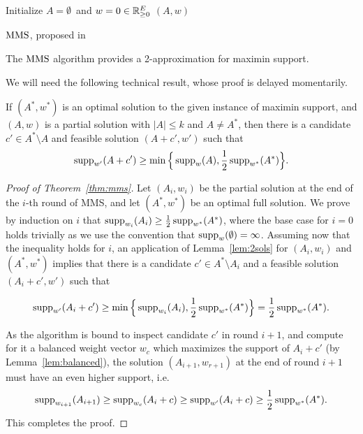 \begin{algorithm}[htb]\label{alg:mms}
\SetAlgoLined
{}
Initialize $A=\emptyset$\ and $w=0\in \mathbb{R}_{\geq 0}^E$\;
\Return $(A,w)$\;
\caption{$\operatorname{MMS}$, proposed in~\cite{sanchez2016maximin}}
\end{algorithm}

\begin{theorem}\label{thm:mms}
The $\operatorname{MMS}$ algorithm provides a 2-approximation for maximin support.
\end{theorem}

We will need the following technical result, whose proof is delayed momentarily. 

\begin{lemma}\label{lem:2sols}
If $(A^*, w^*)$ is an optimal solution to the given instance of maximin support, and $(A,w)$ is a partial solution with $|A|\leq k$ and $A\neq A^*$, then there is a candidate $c'\in A^*\setminus A$ and feasible solution $(A+c', w')$ such that 
$$\operatorname{supp}_{w'}(A+c')\geq \min\Big\{\operatorname{supp}_w(A), \frac{1}{2} \operatorname{supp}_{w^*}(A^*)\Big\}.$$
\end{lemma}


\begin{proof}[Proof of Theorem~\ref{thm:mms}]
Let $(A_i, w_i)$ be the partial solution at the end of the $i$-th round of MMS, and let $(A^*, w^*)$ be an optimal full solution. We prove by induction on $i$ that $\operatorname{supp}_{w_i}(A_i)\geq \frac{1}{2}\operatorname{supp}_{w^*}(A^*)$, where the base case for $i=0$ holds trivially as we use the convention that $\operatorname{supp}_w(\emptyset)=\infty$.
Assuming now that the inequality holds for $i$, an application of Lemma~\ref{lem:2sols} for $(A_i, w_i)$ and $(A^*, w^*)$ implies that there is a candidate $c'\in A^*\setminus A_i$ and a feasible solution $(A_i+c', w')$ such that 

$$\operatorname{supp}_{w'}(A_i+c')\geq \min\Big\{\operatorname{supp}_{w_i}(A_i), \frac{1}{2} \operatorname{supp}_{w^*}(A^*)\Big\} = \frac{1}{2} \operatorname{supp}_{w^*}(A^*).$$

As the algorithm is bound to inspect candidate $c'$ in round $i+1$, and compute for it a balanced weight vector $w_c$ which maximizes the support of $A_i+c'$ (by Lemma~\ref{lem:balanced}), the solution $(A_{i+1}, w_{r+1})$ at the end of round $i+1$ must have an even higher support, i.e. %
%
$$\operatorname{supp}_{w_{i+1}}(A_{i+1})\geq \operatorname{supp}_{w_c}(A_i+c) 
\geq \operatorname{supp}_{w'}(A_i+c) \geq \frac{1}{2} \operatorname{supp}_{w^*}(A^*).$$
%
This completes the proof.
\end{proof}

